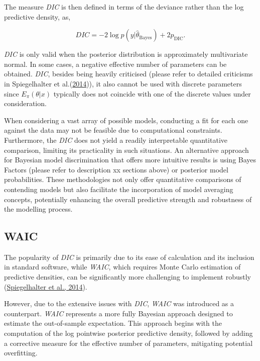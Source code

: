 \documentclass[
  11pt,
]{article}
\begin{document}
The measure \emph{DIC} is then defined in terms of the deviance rather
than the log predictive density, as,

\begin{equation}
DIC = -2 \log p(y|\hat{\theta}_{\text{Bayes}}) + 2p_{\text{DIC}}.
\end{equation}

\emph{DIC} is only valid when the posterior distribution is
approximately multivariate normal. In some cases, a negative effective
number of parameters can be obtained. \emph{DIC}, besides being heavily
criticised (please refer to detailed criticisms in Spiegelhalter et
al.(\protect\hyperlink{ref-Spiegelhalter2014}{2014})), it also cannot be
used with discrete parameters since \(E_{\pi}(\theta|x)\) typically does
not coincide with one of the discrete values under consideration.

When considering a vast array of possible models, conducting a fit for
each one against the data may not be feasible due to computational
constraints. Furthermore, the \emph{DIC} does not yield a readily
interpretable quantitative comparison, limiting its practicality in such
situations. An alternative approach for Bayesian model discrimination
that offers more intuitive results is using Bayes Factors (please refer
to description xx sections above) or posterior model probabilities.
These methodologies not only offer quantitative comparisons of
contending models but also facilitate the incorporation of model
averaging concepts, potentially enhancing the overall predictive
strength and robustness of the modelling process.

\subsection{WAIC}

The popularity of \emph{DIC} is primarily due to its ease of calculation
and its inclusion in standard software, while \emph{WAIC}, which
requires Monte Carlo estimation of predictive densities, can be
significantly more challenging to implement robustly
(\protect\hyperlink{ref-Spiegelhalter2014}{Spiegelhalter et al., 2014}).

However, due to the extensive issues with \emph{DIC}, \emph{WAIC} was
introduced as a counterpart. \emph{WAIC} represents a more fully
Bayesian approach designed to estimate the out-of-sample expectation.
This approach begins with the computation of the log pointwise posterior
predictive density, followed by adding a corrective measure for the
effective number of parameters, mitigating potential overfitting.
\end{document}
